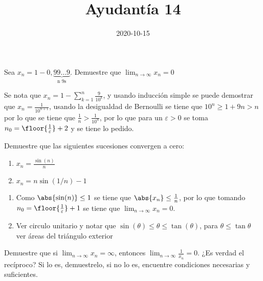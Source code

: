 \documentclass{ayudantia}
\title{Ayudantía 14}
\date{2020-10-15}
\begin{document}
\maketitle


\begin{prob}
    Sea \(x_n=1-0,\underbrace{99\ldots9}_{\text{n 9s}}\). Demuestre que \(\lim_{n\rightarrow\infty}x_n=0\)
\end{prob}

\begin{ans}
    \begin{sol}
        Se nota que \(x_n=1-\sum_{k=1}^n\frac9{10^k}\), y usando inducción simple se puede demostrar que \(x_n=\frac1{10^{n+1}}\), usando la desigualdad de Bernoulli se tiene que \(10^n\geq1+9n>n\) por lo que se tiene que \(\frac1n>\frac1{10^n}\), por lo que para un \(\varepsilon>0\) se toma \(n_0=\floor{\frac1\varepsilon}+2\) y se tiene lo pedido.
    \end{sol}
\end{ans}



\begin{prob}
    Demuestre que las siguientes sucesiones convergen a cero:
    \begin{enumerate}
        \item \(x_n=\frac{\sin(n)}n\)
        \item \(x_n=n\sin(1/n)-1\)
    \end{enumerate}
\end{prob}

\begin{ans}
    \begin{sol}
        \begin{enumerate}
            \item Como \(\abs{\sin(n)}\leq1\) se tiene que \(\abs{x_n}\leq\frac1n\), por lo que tomando \(n_0=\floor{\frac1\varepsilon}+1\) se tiene que \(\lim_{n\rightarrow\infty}x_n=0\).
            \item Ver circulo unitario y notar que \(\sin(\theta)\leq\theta\leq\tan(\theta)\), para \(\theta\leq\tan\theta\) ver áreas del triángulo exterior
        \end{enumerate}
    \end{sol}
\end{ans}



\begin{prob}
    Demuestre que si \(\lim_{n\rightarrow\infty}x_n=\infty\), entonces \(\lim_{n\rightarrow\infty}\frac1{x_n}=0\). ¿Es verdad el recíproco? Si lo es, demuestrelo, si no lo es, encuentre condiciones necesarias y suficientes.
\end{prob}
\end{document}
